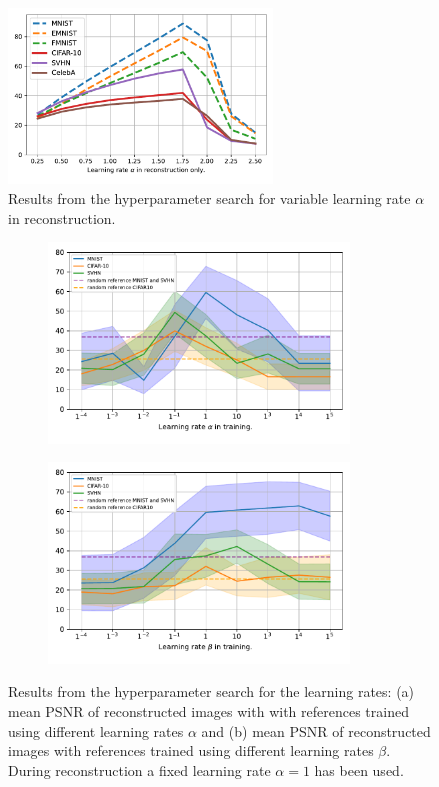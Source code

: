 \begin{figure}
	\centering
	\includegraphics[width=7cm,trim= 10 20 10 0]{data/lr-alpha-rec-all.pdf}
	\caption{Results from the hyperparameter search for variable learning rate $\alpha$ in reconstruction.}
	\label{hyperparam-all}
\end{figure}

\begin{figure}
	\begin{subfigure}{.49\textwidth}
		\centering
		\includegraphics[width=8cm, trim= 0 20 0 0]{data/lr-alpha-log-plot-big.pdf}
		\caption{}
		\label{hyperparam-log-a}
	\end{subfigure}
	\begin{subfigure}{.49\textwidth}
		\centering
		\includegraphics[width=8cm, trim= 0 20 0 0]{data/lr-beta-log-plot-big.pdf}
		\caption{}
		\label{hyperparam-log-b}
	\end{subfigure}
	\caption{Results from the hyperparameter search for the learning rates: (a) mean PSNR of reconstructed images with  with references trained using different learning rates $\alpha$ and (b) mean PSNR of reconstructed images with references trained using different learning rates $\beta$. During reconstruction a fixed learning rate $\alpha=1$ has been used.}
\end{figure}

